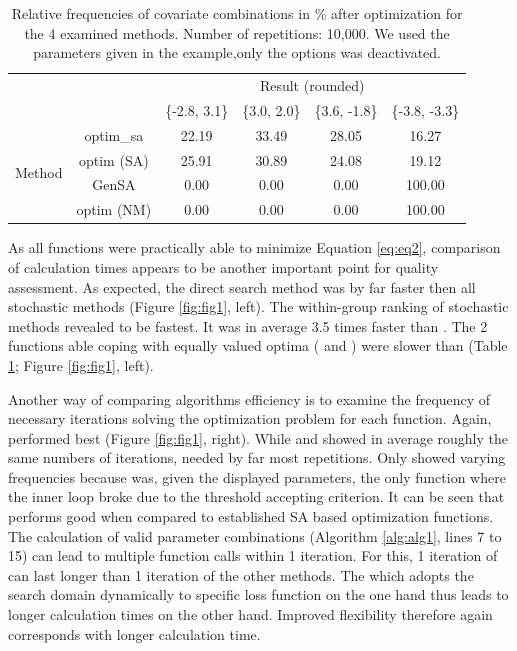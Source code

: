\begin{table}[]
\centering
\caption{Relative frequencies of covariate combinations in \% after optimization for the 4 examined methods. Number of repetitions: 10,000. We used the parameters given in the example,only the  options was deactivated.}
\label{tab:tab1}
\begin{tabular}{cccccc} \cline{3-6}
& \multicolumn{1}{c}{} & \multicolumn{4}{c}{Result (rounded)}                    \\ \cline{3-6} 
&                      & \{-2.8, 3.1\} & \{3.0, 2.0\} & \{3.6, -1.8\} & \{-3.8, -3.3\} \\ \cline{2-6} 
\multirow{4}{*}{Method} & optim\_sa          & 22.19     & 33.49    & 28.05     & 16.27      \\
& optim (SA)            & 25.91     & 30.89    & 24.08     & 19.12      \\
& GenSA              & 0.00      & 0.00     & 0.00      & 100.00     \\
& optim (NM)          & 0.00      & 0.00     & 0.00      & 100.00     \\ \cline{2-6} 
\end{tabular}
\end{table}

As all functions were practically able to minimize Equation \ref{eq:eq2}, comparison of calculation times appears to be another important point for quality assessment. As expected, the direct search method  was by far faster then all stochastic methods (Figure \ref{fig:fig1}, left). The within-group ranking of stochastic methods revealed  to be fastest. It was in average 3.5 times faster than . The 2 functions able coping with equally valued optima ( and ) were slower than  (Table \ref{tab:tab1}; Figure \ref{fig:fig1}, left).

Another way of comparing algorithms efficiency is to examine the frequency of necessary iterations solving the optimization problem for each function. Again,  performed best (Figure \ref{fig:fig1}, right). While  and  showed in average roughly the same numbers of iterations,  needed by far most repetitions. Only  showed varying frequencies because  was, given the displayed parameters, the only function where the inner loop broke due to the threshold accepting criterion. It can be seen that  performs good when compared to established SA based optimization functions. The calculation of valid parameter combinations (Algorithm \ref{alg:alg1}, lines 7 to 15) can lead to multiple function calls within 1 iteration. For this, 1 iteration of  can last longer than 1 iteration of the other methods. The  which adopts the search domain dynamically to specific loss function on the one hand thus leads to longer calculation times on the other hand. Improved flexibility therefore again corresponds with longer calculation time.

